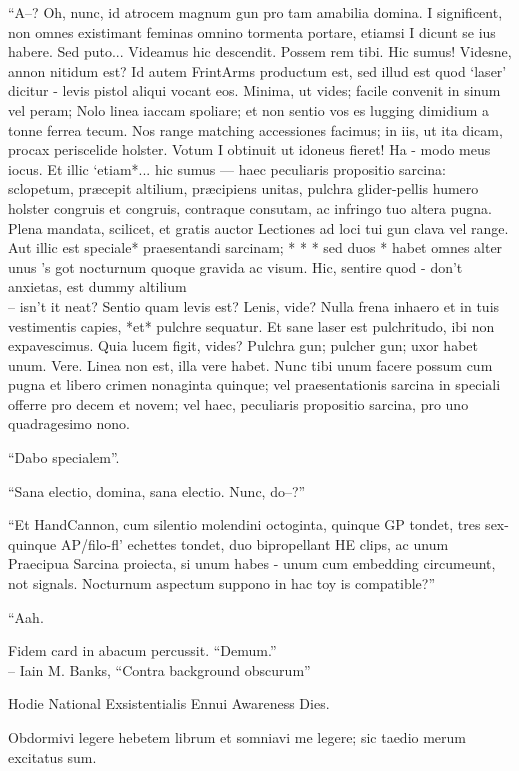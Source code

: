 \documentclass[titlepage,12pt]{memoir}
\begin{document}
“A--? Oh, nunc, id atrocem magnum gun pro tam amabilia domina. I
significent, non omnes existimant feminas omnino tormenta portare, etiamsi I
dicunt se ius habere. Sed puto... Videamus
hic descendit. Possem rem tibi. Hic sumus!
Videsne, annon nitidum est? Id autem FrintArms productum est,
sed illud est quod ‘laser’ dicitur - levis pistol aliqui vocant
eos. Minima, ut vides; facile convenit in sinum vel peram; Nolo
linea iaccam spoliare; et non sentio vos es lugging dimidium a
tonne ferrea tecum. Nos range matching accessiones facimus;
in iis, ut ita dicam, procax periscelide holster. Votum I
obtinuit ut idoneus fieret! Ha - modo meus iocus. Et
illic ‘etiam*... hic sumus — haec peculiaris propositio sarcina: sclopetum,
præcepit altilium, præcipiens unitas, pulchra glider-pellis humero holster
congruis et congruis, contraque consutam, ac infringo tuo
altera pugna. Plena mandata, scilicet, et gratis auctor
Lectiones ad loci tui gun clava vel range. Aut illic est speciale*
praesentandi sarcinam; * * * sed duos * habet omnes alter unus ’s got
nocturnum quoque gravida ac visum. Hic, sentire quod - don’t
anxietas, est dummy altilium \\-- isn’t it neat? Sentio quam levis est?
Lenis, vide? Nulla frena inhaero et in tuis vestimentis capies, *et*
pulchre sequatur. Et sane laser est pulchritudo, ibi
non expavescimus. Quia lucem figit, vides? Pulchra gun;
pulcher gun; uxor habet unum. Vere. Linea non est, illa
vere habet. Nunc tibi unum facere possum cum pugna et libero
crimen nonaginta quinque; vel praesentationis sarcina in speciali
offerre pro decem et novem; vel haec, peculiaris propositio sarcina, pro
uno quadragesimo nono.

“Dabo specialem”.

“Sana electio, domina, sana electio. Nunc, do--?”

“Et HandCannon, cum silentio molendini octoginta, quinque GP tondet, tres
sex-quinque AP/filo-fl’ echettes tondet, duo bipropellant HE clips, ac unum
Praecipua Sarcina proiecta, si unum habes - unum cum embedding
circumeunt, not signals. Nocturnum aspectum suppono in hac toy is
compatible?”

“Aah.

Fidem card in abacum percussit. “Demum.”
\\-- Iain M. Banks, “Contra background obscurum”

Hodie National Exsistentialis Ennui Awareness Dies.

Obdormivi legere hebetem librum et somniavi me legere;
sic taedio merum excitatus sum.
\end{document}
